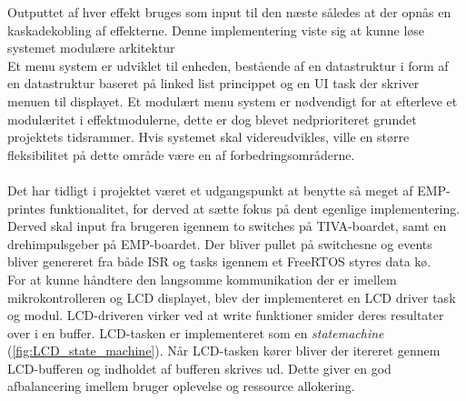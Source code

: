 Outputtet af hver effekt bruges som input til den næste således at der opnås en kaskadekobling af effekterne.
Denne implementering viste sig at kunne løse systemet modulære arkitektur 
\\
Et menu system er udviklet til enheden, bestående af en datastruktur i form af en datastruktur baseret på linked list princippet og en UI task der skriver menuen til displayet.
Et modulært menu system er nødvendigt for at efterleve et modulæritet i effektmodulerne, dette er dog blevet nedprioriteret grundet projektets tidsrammer.
Hvis systemet skal videreudvikles, ville en større fleksibilitet på dette område være en af forbedringsområderne.
\\
\\
Det har tidligt i projektet været et udgangspunkt at benytte så meget af EMP-printes funktionalitet, for derved at sætte fokus på dent egenlige implementering. 
Derved skal input fra brugeren igennem to switches på TIVA-boardet, samt en drehimpulsgeber på EMP-boardet.
Der bliver pullet på switchesne og events bliver genereret fra både ISR og tasks igennem et FreeRTOS styres data kø.
\\
For at kunne håndtere den langsomme kommunikation der er imellem mikrokontrolleren og LCD displayet, blev der implementeret en LCD driver task og modul. 
LCD-driveren virker ved at write funktioner smider deres resultater over i en buffer.
LCD-tasken er implementeret som en \textit{statemachine} (\ref{fig:LCD_state_machine}).
Når LCD-tasken kører bliver der itereret gennem LCD-bufferen og indholdet af bufferen skrives ud.
Dette giver en god afbalancering imellem bruger oplevelse og ressource allokering. 
